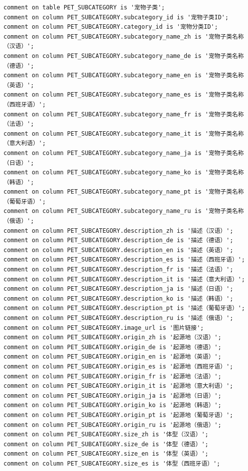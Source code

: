 \begin{verbatim}
comment on table PET_SUBCATEGORY is '宠物子类';
comment on column PET_SUBCATEGORY.subcategory_id is '宠物子类ID';
comment on column PET_SUBCATEGORY.category_id is '宠物分类ID';
comment on column PET_SUBCATEGORY.subcategory_name_zh is '宠物子类名称（汉语）';
comment on column PET_SUBCATEGORY.subcategory_name_de is '宠物子类名称（德语）';
comment on column PET_SUBCATEGORY.subcategory_name_en is '宠物子类名称（英语）';
comment on column PET_SUBCATEGORY.subcategory_name_es is '宠物子类名称（西班牙语）';
comment on column PET_SUBCATEGORY.subcategory_name_fr is '宠物子类名称（法语）';
comment on column PET_SUBCATEGORY.subcategory_name_it is '宠物子类名称（意大利语）';
comment on column PET_SUBCATEGORY.subcategory_name_ja is '宠物子类名称（日语）';
comment on column PET_SUBCATEGORY.subcategory_name_ko is '宠物子类名称（韩语）';
comment on column PET_SUBCATEGORY.subcategory_name_pt is '宠物子类名称（葡萄牙语）';
comment on column PET_SUBCATEGORY.subcategory_name_ru is '宠物子类名称（俄语）';
comment on column PET_SUBCATEGORY.description_zh is '描述（汉语）';
comment on column PET_SUBCATEGORY.description_de is '描述（德语）';
comment on column PET_SUBCATEGORY.description_en is '描述（英语）';
comment on column PET_SUBCATEGORY.description_es is '描述（西班牙语）';
comment on column PET_SUBCATEGORY.description_fr is '描述（法语）';
comment on column PET_SUBCATEGORY.description_it is '描述（意大利语）';
comment on column PET_SUBCATEGORY.description_ja is '描述（日语）';
comment on column PET_SUBCATEGORY.description_ko is '描述（韩语）';
comment on column PET_SUBCATEGORY.description_pt is '描述（葡萄牙语）';
comment on column PET_SUBCATEGORY.description_ru is '描述（俄语）';
comment on column PET_SUBCATEGORY.image_url is '图片链接';
comment on column PET_SUBCATEGORY.origin_zh is '起源地（汉语）';
comment on column PET_SUBCATEGORY.origin_de is '起源地（德语）';
comment on column PET_SUBCATEGORY.origin_en is '起源地（英语）';
comment on column PET_SUBCATEGORY.origin_es is '起源地（西班牙语）';
comment on column PET_SUBCATEGORY.origin_fr is '起源地（法语）';
comment on column PET_SUBCATEGORY.origin_it is '起源地（意大利语）';
comment on column PET_SUBCATEGORY.origin_ja is '起源地（日语）';
comment on column PET_SUBCATEGORY.origin_ko is '起源地（韩语）';
comment on column PET_SUBCATEGORY.origin_pt is '起源地（葡萄牙语）';
comment on column PET_SUBCATEGORY.origin_ru is '起源地（俄语）';
comment on column PET_SUBCATEGORY.size_zh is '体型（汉语）';
comment on column PET_SUBCATEGORY.size_de is '体型（德语）';
comment on column PET_SUBCATEGORY.size_en is '体型（英语）';
comment on column PET_SUBCATEGORY.size_es is '体型（西班牙语）';

\end{verbatim}
